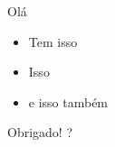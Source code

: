 \begin{frame}{Olá}
\protect\hypertarget{oluxe1}{}
\begin{itemize}
\tightlist
\item
  Tem isso
\item
  Isso
\item
  e isso também
\end{itemize}
\end{frame}

\begin{frame}{Obrigado!}
\protect\hypertarget{obrigado}{}
?
\end{frame}

